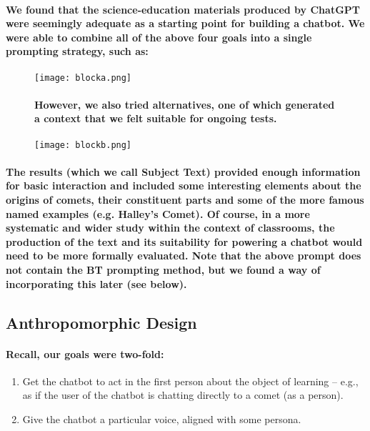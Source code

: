\documentclass{article}
\begin{document}
\paragraph{We found that the science-education materials produced by ChatGPT were seemingly adequate as a starting point for building a chatbot. We were able to combine all of the above four goals into a single prompting strategy, such as:}

\begin{figure}[htbp]
    \centering
    \texttt{[image: blocka.png]}
    \label{fig:blocka}

    \paragraph{However, we also tried alternatives, one of which generated a context that we felt suitable for ongoing tests.\newline}

    \texttt{[image: blockb.png]}
    \label{fig:blockb}
\end{figure}

\newpage
\paragraph{The results (which we call Subject Text) provided enough information for basic interaction and included some interesting elements about the origins of comets, their constituent parts and some of the more famous named examples (e.g. Halley’s Comet). Of course, in a more systematic and wider study within the context of classrooms, the production of the text and its suitability for powering a chatbot would need to be more formally evaluated. Note that the above prompt does not contain the BT prompting method, but we found a way of incorporating this later (see below).}

\newpage

\subsection*{Anthropomorphic Design}

\paragraph{Recall, our goals were two-fold:}

\begin{enumerate}
    \item Get the chatbot to act in the first person about the object of learning – e.g., as if the user of the chatbot is chatting directly to a comet (as a person).
    \item Give the chatbot a particular voice, aligned with some persona.
\end{enumerate}
\end{document}
